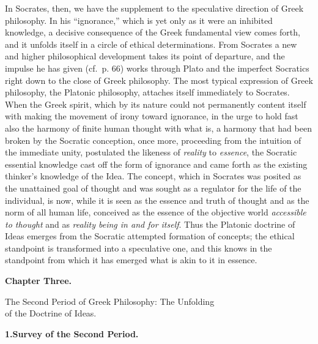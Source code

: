 \divrule

In Socrates, then, we have the supplement to the speculative direction of Greek philosophy. In his ``ignorance,'' which is yet only as it were an inhibited knowledge, a decisive consequence of the Greek fundamental view comes forth, and it unfolds itself in a circle of ethical determinations. From Socrates a new and higher philosophical development takes its point of departure, and the impulse he has given (cf.\ p. 66) works through Plato and the imperfect Socratics right down to the close of Greek philosophy. The most typical expression of Greek philosophy, the Platonic philosophy, attaches itself immediately to Socrates. When the Greek spirit, which by its nature could not permanently content itself with making the movement of irony toward ignorance, in the urge to hold fast also the harmony of finite human thought with what is, a harmony that had been broken by the Socratic conception, once more, proceeding from the intuition of the immediate unity, postulated the likeness of \emph{reality} to \emph{essence}, the Socratic essential knowledge cast off the form of ignorance and came forth as the existing thinker's knowledge of the Idea. The concept, which in Socrates was posited as the unattained goal of thought and was sought as a regulator for the life of the individual, is now, while it is seen as the essence and truth of thought and as the norm of all human life, conceived as the essence of the objective world \emph{accessible to thought} and as \emph{reality being in and for itself}. Thus the Platonic doctrine of Ideas emerges from the Socratic attempted formation of concepts; the ethical standpoint is transformed into a speculative one, and this knows in the standpoint from which it has emerged what is akin to it in essence.

\divrule

\begin{center}
{\Large\textbf{Chapter Three.}}
\end{center}

\divrule

\begin{center}
{\Large The Second Period of Greek Philosophy: The Unfolding\\
of the Doctrine of Ideas.}
\end{center}

\divrule

\begin{center}
\textbf{1.\enspace Survey of the Second Period.}
\end{center}

